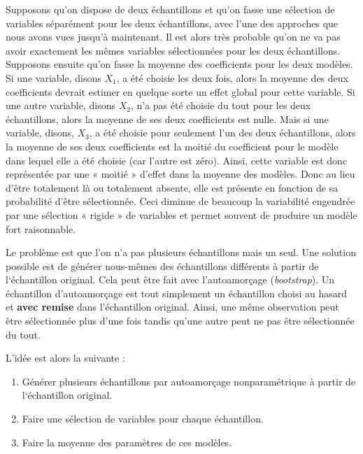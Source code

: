\documentclass[
  11pt,
  letterpaper,
]{book}
\providecommand{\tightlist}{%
  \setlength{\itemsep}{0pt}\setlength{\parskip}{0pt}}\usepackage{longtable,booktabs,array}
\theoremstyle{definition}
\theoremstyle{remark}
\begin{document}
Supposons qu'on dispose de deux échantillons et qu'on fasse une
sélection de variables séparément pour les deux échantillons, avec l'une
des approches que nous avons vues jusqu'à maintenant. Il est alors très
probable qu'on ne va pas avoir exactement les mêmes variables
sélectionnées pour les deux échantillons. Supposons ensuite qu'on fasse
la moyenne des coefficients pour les deux modèles. Si une variable,
disons \(X_1\), a été choisie les deux fois, alors la moyenne des deux
coefficients devrait estimer en quelque sorte un effet global pour cette
variable. Si une autre variable, disons \(X_2\), n'a pas été choisie du
tout pour les deux échantillons, alors la moyenne de ses deux
coefficients est nulle. Mais si une variable, disons, \(X_3\), a été
choisie pour seulement l'un des deux échantillons, alors la moyenne de
ses deux coefficients est la moitié du coefficient pour le modèle dans
lequel elle a été choisie (car l'autre est zéro). Ainsi, cette variable
est donc représentée par une « moitié » d'effet dans la moyenne des
modèles. Donc au lieu d'être totalement là ou totalement absente, elle
est présente en fonction de sa probabilité d'être sélectionnée. Ceci
diminue de beaucoup la variabilité engendrée par une sélection « rigide
» de variables et permet souvent de produire un modèle fort raisonnable.

Le problème est que l'on n'a pas plusieurs échantillons mais un seul.
Une solution possible est de générer nous-mêmes des échantillons
différents à partir de l`échantillon original. Cela peut être fait avec
l'autoamorçage (\emph{bootstrap}). Un échantillon d'autoamorçage est
tout simplement un échantillon choisi au hasard et \textbf{avec remise}
dans l'échantillon original. Ainsi, une même observation peut être
sélectionnée plus d'une fois tandis qu'une autre peut ne pas être
sélectionnée du tout.

L'idée est alors la suivante :

\begin{enumerate}
\def\labelenumi{\arabic{enumi})}
\tightlist
\item
  Générer plusieurs échantillons par autoamorçage nonparamétrique à
  partir de l`échantillon original.
\item
  Faire une sélection de variables pour chaque échantillon.
\item
  Faire la moyenne des paramètres de ces modèles.
\end{enumerate}
\end{document}

